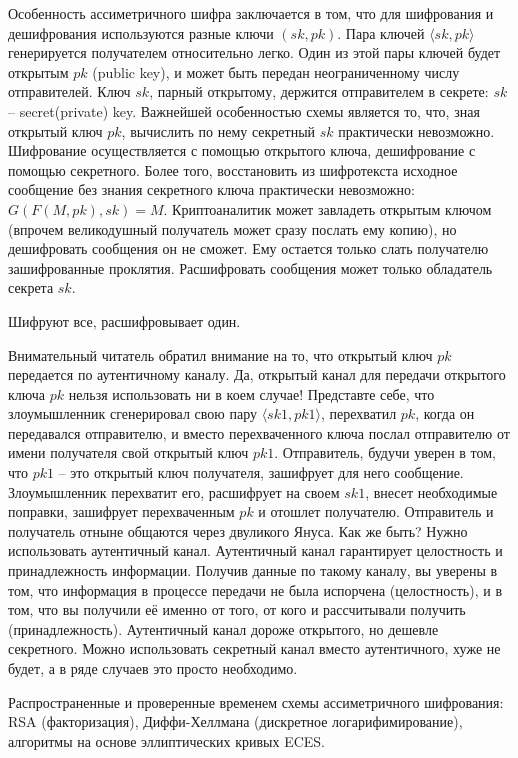 Особенность ассиметричного шифра заключается в том, что для шифрования и дешифрования используются разные ключи $(sk, pk)$. Пара ключей $\langle sk, pk\rangle$ генерируется получателем относительно легко. Один из этой пары ключей будет открытым $pk$ (public key), и может быть передан неограниченному числу отправителей. Ключ $sk$, парный открытому, держится отправителем в секрете: $sk$ – secret(private) key. Важнейшей особенностью схемы является то, что, зная открытый ключ $pk$, вычислить по нему секретный $sk$ практически невозможно. Шифрование осуществляется с помощью открытого ключа, дешифрование с помощью секретного. Более того, восстановить из шифротекста исходное сообщение без знания секретного ключа практически невозможно: $G(F(M, pk), sk)=M$. Криптоаналитик может завладеть открытым ключом (впрочем великодушный получатель может сразу послать ему копию), но дешифровать сообщения он не сможет. Ему остается только слать получателю зашифрованные проклятия. Расшифровать сообщения может только обладатель секрета $sk$.

Шифруют все, расшифровывает один.

Внимательный читатель обратил внимание на то, что открытый ключ $pk$ передается по аутентичному каналу. Да, открытый канал для передачи открытого ключа $pk$ нельзя использовать ни в коем случае! Представте себе, что злоумышленник сгенерировал свою пару $\langle sk1, pk1\rangle$, перехватил $pk$, когда он передавался отправителю, и вместо перехваченного ключа послал отправителю от имени получателя свой открытый ключ $pk1$. Отправитель, будучи уверен в том, что $pk1$ – это открытый ключ получателя, зашифрует для него сообщение. Злоумышленник перехватит его, расшифрует на своем $sk1$, внесет необходимые поправки, зашифрует перехваченным $pk$ и отошлет получателю. Отправитель и получатель отныне общаются через двуликого Януса. Как же быть? Нужно использовать \alert{аутентичный} канал. Аутентичный канал гарантирует целостность и принадлежность информации. Получив данные по такому каналу, вы уверены в том, что информация в процессе передачи не была испорчена (целостность), и в том, что вы получили её именно от того, от кого и рассчитывали получить (принадлежность). Аутентичный канал дороже открытого, но дешевле секретного. Можно использовать секретный канал вместо аутентичного, хуже не будет, а в ряде случаев это просто необходимо.

Распространенные и проверенные временем схемы ассиметричного шифрования: RSA (факторизация), Диффи-Хеллмана (дискретное логарифимирование), алгоритмы на основе эллиптических кривых ECES.


